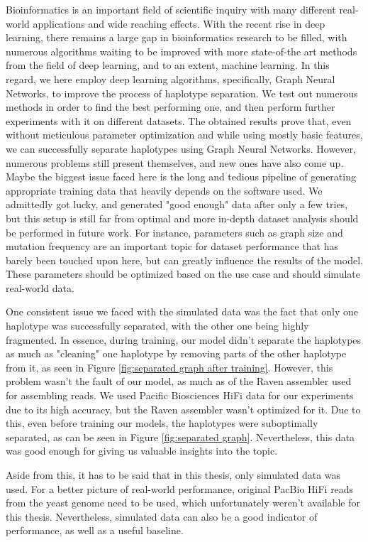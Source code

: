 \documentclass[times, utf8, diplomski, english]{fer_eng}
\begin{document}
Bioinformatics is an important field of scientific inquiry with many different real-world applications and wide reaching effects. With the recent rise in deep learning, there remains a large gap in bioinformatics research to be filled, with numerous algorithms waiting to be improved with more state-of-the art methods from the field of deep learning, and to an extent, machine learning. In this regard, we here employ deep learning algorithms, specifically, Graph Neural Networks, to improve the process of haplotype separation. We test out numerous methods in order to find the best performing one, and then perform further experiments with it on different datasets. The obtained results prove that, even without meticulous parameter optimization and while using mostly basic features, we can successfully separate haplotypes using Graph Neural Networks. However, numerous problems still present themselves, and new ones have also come up. Maybe the biggest issue faced here is the long and tedious pipeline of generating appropriate training data that heavily depends on the software used. We admittedly got lucky, and generated "good enough" data after only a few tries, but this setup is still far from optimal and more in-depth dataset analysis should be performed in future work. For instance, parameters such as graph size and mutation frequency are an important topic for dataset performance that has barely been touched upon here, but can greatly influence the results of the model. These parameters should be optimized based on the use case and should simulate real-world data.

One consistent issue we faced with the simulated data was the fact that only one haplotype was successfully separated, with the other one being highly fragmented. In essence, during training, our model didn't separate the haplotypes as much as "cleaning" one haplotype by removing parts of the other haplotype from it, as seen in Figure \ref{fig:separated graph after training}. However, this problem wasn't the fault of our model, as much as of the Raven assembler used for assembling reads. We used Pacific Biosciences HiFi data for our experiments due to its high accuracy, but the Raven assembler wasn't optimized for it. Due to this, even before training our models, the haplotypes were suboptimally separated, as can be seen in Figure \ref{fig:separated graph}. Nevertheless, this data was good enough for giving us valuable insights into the topic.

Aside from this, it has to be said that in this thesis, only simulated data was used. For a better picture of real-world performance, original PacBio HiFi reads from the yeast genome need to be used, which unfortunately weren't available for this thesis. Nevertheless, simulated data can also be a good indicator of performance, as well as a useful baseline.
\end{document}
